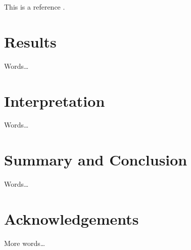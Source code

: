 \documentclass[conference]{IEEEtran}
\begin{document}
This is a reference \cite{Loughry2013a}.

\section{Results}

Words\ldots

\section{Interpretation}

Words\ldots

\section{Summary and Conclusion}

Words\ldots

\section{Acknowledgements}

More words\ldots




\end{document}
